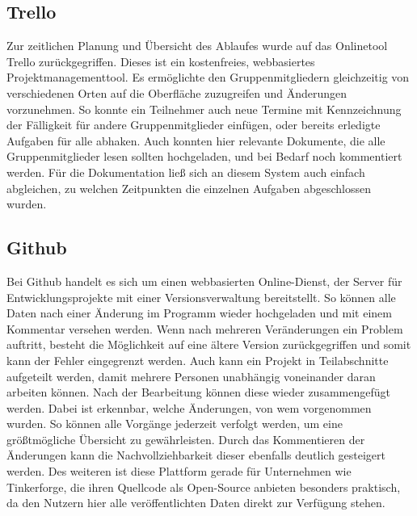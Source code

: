 
\subsection{Trello}
Zur zeitlichen Planung und Übersicht des Ablaufes wurde auf das Onlinetool Trello zurückgegriffen. Dieses ist ein kostenfreies, webbasiertes Projektmanagementtool. Es ermöglichte den Gruppenmitgliedern gleichzeitig von verschiedenen Orten auf die Oberfläche zuzugreifen und Änderungen vorzunehmen. So konnte ein Teilnehmer auch neue Termine mit Kennzeichnung der Fälligkeit für andere Gruppenmitglieder einfügen, oder bereits erledigte Aufgaben für alle abhaken. Auch konnten hier relevante Dokumente, die alle Gruppenmitglieder lesen sollten hochgeladen, und bei Bedarf noch kommentiert werden. Für die Dokumentation ließ sich an diesem System auch einfach abgleichen, zu welchen Zeitpunkten die einzelnen Aufgaben abgeschlossen wurden.

\subsection{Github}
Bei Github handelt es sich um einen webbasierten Online-Dienst, der Server für Entwicklungsprojekte mit einer Versionsverwaltung bereitstellt. So können alle Daten nach einer Änderung im Programm wieder hochgeladen und mit einem Kommentar versehen werden. Wenn nach mehreren Veränderungen ein Problem auftritt, besteht die Möglichkeit auf eine ältere Version zurückgegriffen und somit kann der Fehler eingegrenzt werden. Auch kann ein Projekt in Teilabschnitte aufgeteilt werden, damit mehrere Personen unabhängig voneinander daran arbeiten können. Nach der Bearbeitung können diese wieder zusammengefügt werden. Dabei ist erkennbar, welche Änderungen, von wem vorgenommen wurden. So können alle Vorgänge jederzeit verfolgt werden, um eine größtmögliche Übersicht zu gewährleisten. Durch das Kommentieren der Änderungen kann die Nachvollziehbarkeit dieser ebenfalls deutlich gesteigert werden. Des weiteren ist diese Plattform gerade für Unternehmen wie Tinkerforge, die ihren Quellcode als Open-Source anbieten besonders praktisch, da den Nutzern hier alle veröffentlichten Daten direkt zur Verfügung stehen.
